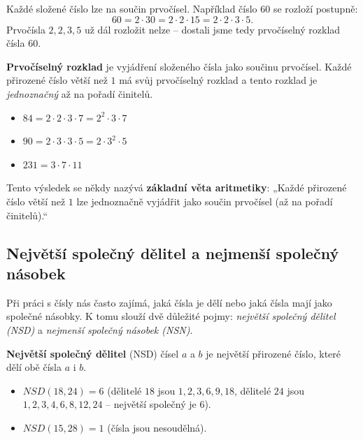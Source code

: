 \documentclass[12pt,a4paper]{article}
\begin{document}
Každé složené číslo lze  na součin prvočísel.  
Například číslo $60$ se rozloží postupně:
\[
60 = 2 \cdot 30 = 2 \cdot 2 \cdot 15 = 2 \cdot 2 \cdot 3 \cdot 5.
\]
Prvočísla $2,2,3,5$ už dál rozložit nelze – dostali jsme tedy prvočíselný rozklad čísla $60$.  

\begin{definitionbox}
\textbf{Prvočíselný rozklad} je vyjádření složeného čísla jako součinu prvočísel.  
Každé přirozené číslo větší než $1$ má svůj prvočíselný rozklad a tento rozklad je \emph{jednoznačný} až na pořadí činitelů.
\end{definitionbox}

\begin{examplebox}
\begin{itemize}
    \item $84 = 2 \cdot 2 \cdot 3 \cdot 7 = 2^2 \cdot 3 \cdot 7$  
    \item $90 = 2 \cdot 3 \cdot 3 \cdot 5 = 2 \cdot 3^2 \cdot 5$  
    \item $231 = 3 \cdot 7 \cdot 11$
\end{itemize}
\end{examplebox}

\begin{notebox}
Tento výsledek se někdy nazývá \textbf{základní věta aritmetiky}:  
„Každé přirozené číslo větší než $1$ lze jednoznačně vyjádřit jako součin prvočísel (až na pořadí činitelů).“
\end{notebox}


\subsection{Největší společný dělitel a nejmenší společný násobek}

Při práci s čísly nás často zajímá, jaká čísla je dělí nebo jaká čísla mají jako společné násobky.  
K tomu slouží dvě důležité pojmy: \emph{největší společný dělitel (NSD)} a \emph{nejmenší společný násobek (NSN)}.  

\begin{definitionbox}
\textbf{Největší společný dělitel} (NSD) čísel $a$ a $b$ je největší přirozené číslo, které dělí obě čísla $a$ i $b$.  
\end{definitionbox}

\begin{examplebox}
\begin{itemize}
    \item $NSD(18, 24) = 6$ (dělitelé $18$ jsou $1,2,3,6,9,18$, dělitelé $24$ jsou $1,2,3,4,6,8,12,24$ – největší společný je $6$).  
    \item $NSD(15, 28) = 1$ (čísla jsou nesoudělná).
\end{itemize}
\end{examplebox}
\end{document}
